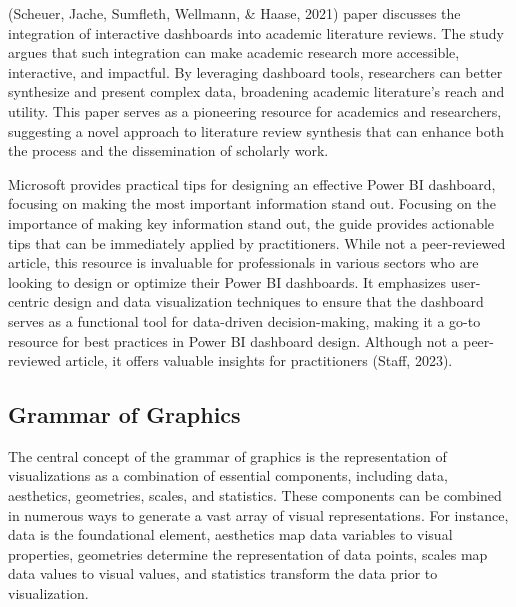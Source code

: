 \documentclass[print]{nuthesis}
\begin{document}
(Scheuer, Jache, Sumfleth, Wellmann, \& Haase, 2021) paper discusses the integration of interactive dashboards into academic literature reviews.
The study argues that such integration can make academic research more accessible, interactive, and impactful.
By leveraging dashboard tools, researchers can better synthesize and present complex data, broadening academic literature's reach and utility.
This paper serves as a pioneering resource for academics and researchers, suggesting a novel approach to literature review synthesis that can enhance both the process and the dissemination of scholarly work.

Microsoft provides practical tips for designing an effective Power BI dashboard, focusing on making the most important information stand out.
Focusing on the importance of making key information stand out, the guide provides actionable tips that can be immediately applied by practitioners.
While not a peer-reviewed article, this resource is invaluable for professionals in various sectors who are looking to design or optimize their Power BI dashboards.
It emphasizes user-centric design and data visualization techniques to ensure that the dashboard serves as a functional tool for data-driven decision-making, making it a go-to resource for best practices in Power BI dashboard design.
Although not a peer-reviewed article, it offers valuable insights for practitioners (Staff, 2023).

\hypertarget{grammar-of-graphics}{%
\subsection{Grammar of Graphics}\label{grammar-of-graphics}}

The central concept of the grammar of graphics is the representation of visualizations as a combination of essential components, including data, aesthetics, geometries, scales, and statistics.
These components can be combined in numerous ways to generate a vast array of visual representations.
For instance, data is the foundational element, aesthetics map data variables to visual properties, geometries determine the representation of data points, scales map data values to visual values, and statistics transform the data prior to visualization.
\end{document}

